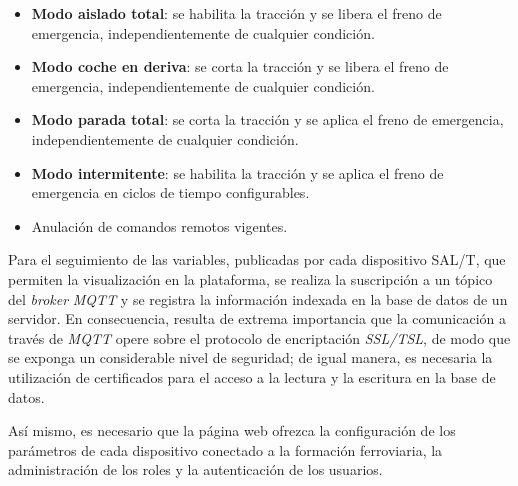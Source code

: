 \begin{itemize}
	\item \textbf{Modo aislado total}: se habilita la tracción y se libera el freno de emergencia, independientemente de cualquier condición. 

    \item \textbf{Modo coche en deriva}: se corta la tracción y se libera el freno de emergencia, independientemente de cualquier condición. 

    \item \textbf{Modo parada total}: se corta la tracción y se aplica el freno de emergencia, independientemente de cualquier condición. 
    
    \item \textbf{Modo intermitente}: se habilita la tracción y se aplica el freno de emergencia en ciclos de tiempo configurables. 

    \item Anulación de comandos remotos vigentes.

\end{itemize}


Para el seguimiento de las variables, publicadas por cada dispositivo SAL/T, que permiten la visualización en la plataforma, se realiza la suscripción a un tópico del \textit{broker} \textit{MQTT} y se registra la información indexada en la base de datos de un servidor. En consecuencia, resulta de extrema importancia que la comunicación a través de \textit{MQTT} opere sobre el protocolo de encriptación \textit{SSL/TSL}, de modo que se exponga un considerable nivel de seguridad; de igual manera, es necesaria la utilización de certificados para el acceso a la lectura y la escritura en la base de datos.  

Así mismo, es necesario que la página web ofrezca la configuración de los parámetros de cada dispositivo conectado a la formación ferroviaria, la administración de los roles y la autenticación de los usuarios.

